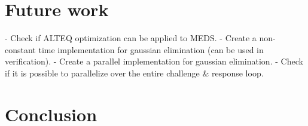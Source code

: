 \documentclass[11pt,a4paper]{report}
\begin{document}
\chapter{Future work}
\label{ch:futurework}
- Check if ALTEQ optimization can be applied to MEDS.
- Create a non-constant time implementation for gaussian elimination (can be used in verification).
- Create a parallel implementation for gaussian elimination.
- Check if it is possible to parallelize over the entire challenge \& response loop.

\chapter{Conclusion}
\label{ch:conclusion}





\end{document}
